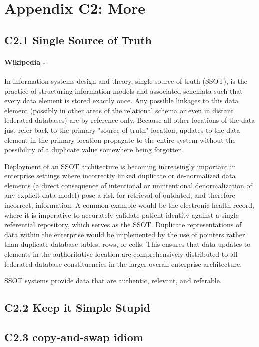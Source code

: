\documentclass{book}
\begin{document}
\section{Appendix C2: More }
\subsection{C2.1 Single Source of Truth}\label{SSOT}
\paragraph{Wikipedia -} 
In information systems design and theory, single source of truth (SSOT), is the practice of structuring information models and associated schemata such that every data element is stored exactly once.
Any possible linkages to this data element (possibly in other areas of the relational schema or even in distant federated databases) are by reference only.
Because all other locations of the data just refer back to the primary "source of truth" location,
updates to the data element in the primary location propagate to the entire system without the possibility of a duplicate value somewhere being forgotten.

Deployment of an SSOT architecture is becoming increasingly important in enterprise settings where incorrectly linked duplicate
or de-normalized data elements (a direct consequence of intentional or unintentional denormalization of any explicit data model) pose a risk for retrieval of outdated,
and therefore incorrect, information.
A common example would be the electronic health record, where it is imperative to accurately validate patient identity against a single referential repository, which serves as the SSOT.
Duplicate representations of data within the enterprise would be implemented by the use of pointers rather than duplicate database tables, rows, or cells.
This ensures that data updates to elements in the authoritative location are comprehensively distributed to all federated database constituencies in the larger overall enterprise architecture.

SSOT systems provide data that are authentic, relevant, and referable.

\subsection{C2.2 Keep it Simple Stupid}\label{KISS}
\subsection{C2.3 copy-and-swap idiom}\label{casi}
\end{document}
